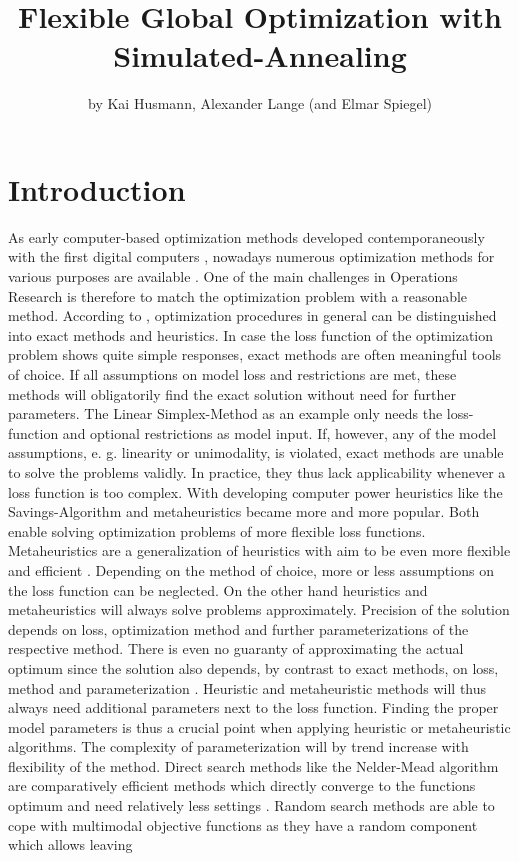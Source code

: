 \title{Flexible Global Optimization with Simulated-Annealing}
\author{by Kai Husmann, Alexander Lange (and Elmar Spiegel)}

\maketitle


\section{Introduction}

As early computer-based optimization methods developed contemporaneously with the first digital computers \citep{corana_1987}, nowadays numerous optimization methods for various purposes are available \citep{wegener_2005}. One of the main challenges in Operations Research is therefore to match the optimization problem with a reasonable method. According to  \citet{kirkpatrick_1983}, optimization procedures in general can be distinguished into exact methods and heuristics. In case the loss function of the optimization problem shows quite simple responses, exact methods are often meaningful tools of choice. If all assumptions on model loss and restrictions are met, these methods will obligatorily find the exact solution without need for further parameters. The  Linear Simplex-Method \citep{dantzig_1959} as an example only needs the loss-function and optional restrictions as model input. If, however, any of the model assumptions, e. g. linearity or unimodality, is violated, exact methods are unable to solve the problems validly. In practice, they thus lack applicability whenever a loss function is too complex. With developing computer power heuristics like the Savings-Algorithm \citep{clarke_1964} and metaheuristics became more and more popular. Both enable solving optimization problems of more flexible loss functions. Metaheuristics are a generalization of heuristics with aim to be even more flexible and efficient \citep{blum_2003}. Depending on the method of choice, more or less assumptions on the loss function can be neglected. On the other hand heuristics and metaheuristics will always solve problems approximately. Precision of the solution depends on loss, optimization method and further parameterizations of the respective method. There is even no guaranty of approximating the actual optimum since the solution also depends, by contrast to exact methods, on loss, method and parameterization \citep{blum_2003}. Heuristic and metaheuristic methods will thus always need additional parameters next to the loss function. Finding the proper model parameters is thus a crucial point when applying heuristic or metaheuristic algorithms. The complexity of parameterization will by trend increase with flexibility of the method. Direct search methods like the Nelder-Mead algorithm are comparatively efficient methods which directly converge to the functions optimum and need relatively less settings \citep{geiger_1999}. Random search methods are able to cope with multimodal objective functions as they have a random component which allows leaving 
